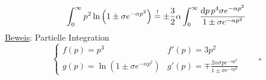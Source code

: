 \begin{equation}
    \begin{split}
        \int_0^\infty p^2 \ln \left( 1 \pm \sigma e^{-\alpha p^2} \right) \overset{!}{=} \pm \frac{3}{2} \alpha \int_0^\infty \frac{\mathrm{d} p \, p^4 \sigma e^{-\alpha p^2}}{1 \pm \sigma e^{-\alpha p^2}}
    \end{split}
\end{equation}
\underline{Beweis}: Partielle Integration
\begin{equation}
    \begin{cases}
        f(p) = p^3 & f'(p) = 3p^2 \\
        g(p) = \ln \left( 1 \pm \sigma e^{-\alpha p^2} \right) & g'(p) = \mp \frac{2 \alpha \sigma p e^{-\alpha p^2}}{1 \pm \sigma e^{- \alpha p^2}}
    \end{cases}
    \qquad \square
\end{equation}
